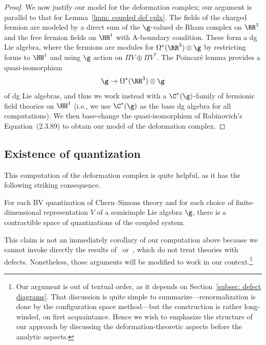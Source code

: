 \documentclass[10pt]{amsart}
\begin{document}
\begin{proof}
We now justify our model for the deformation complex;
our argument is parallel to that for Lemma~\ref{lmm: coupled def cplx}.
The fields of the charged fermion are modeled by a direct sum of the $\g$-valued de Rham complex on $\RR^3$ and the free fermion fields on $\HH^1$ with A-boundary condition.
These form a dg Lie algebra, 
where the fermions are modules for $\Omega^*(\RR^3) \otimes \g$ by restricting forms to $\HH^1$ and using $\g$ action on $\Pi V \oplus \Pi V^*$.
The Poincar\'e lemma provides a quasi-isomorphism
\[
\g \to \Omega^*(\RR^3) \otimes \g
\]
of dg Lie algebras, 
and thus we work instead with a $\C^*(\g)$-family of fermionic field theories on $\HH^1$
(i.e., we use $\C^*(\g)$ as the base dg algebra for all computations).
We then base-change the quasi-isomorphism of Rabinovich's Equation~(2.3.89) to obtain our model of the deformation complex.
\end{proof}

\subsection{Existence of quantization}

This computation of the deformation complex is quite helpful, 
as it has the following striking consequence.

\begin{prp} 
\label{prp: existence of defect quants}
For each BV quantization of Chern--Simons theory and for each choice of finite-dimensional representation $V$ of a semisimple Lie algebra $\g$,
there is a contractible space of quantizations of the coupled system.
\end{prp}

This claim is not an immediately corollary of our computation above 
because we cannot invoke directly the results of~\cite{CosBook} or~\cite{RabThesis},
which do not treat theories with defects.
Nonetheless, those arguments will be modified to work in our context.\footnote{Our argument is out of textual order, as it depends on Section~\ref{subsec: defect diagrams}. 
That discussion is quite simple to summarize---renormalization is done by the configuration space method---but the construction is rather long-winded, on first acquaintance. 
Hence we wish to emphasize the structure of our approach by discussing the deformation-theoretic aspects before the analytic aspects.}
\end{document}
